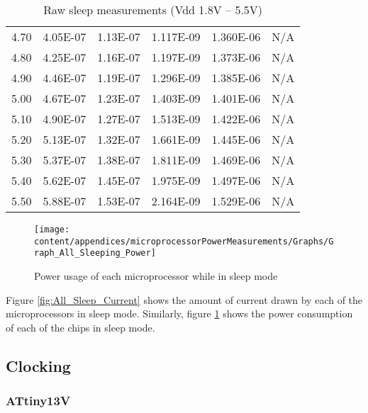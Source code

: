\begin{table}[htp]
\begin{centering}
\begin{tabular}{|r|r|r|r|r|r|}
4.70  & 4.05E-07  & 1.13E-07  & 1.117E-09  & 1.360E-06  & N/A \tabularnewline
4.80  & 4.25E-07  & 1.16E-07  & 1.197E-09  & 1.373E-06  & N/A \tabularnewline
4.90  & 4.46E-07  & 1.19E-07  & 1.296E-09  & 1.385E-06  & N/A \tabularnewline
5.00  & 4.67E-07  & 1.23E-07  & 1.403E-09  & 1.401E-06  & N/A \tabularnewline
5.10  & 4.90E-07  & 1.27E-07  & 1.513E-09  & 1.422E-06  & N/A \tabularnewline
5.20  & 5.13E-07  & 1.32E-07  & 1.661E-09  & 1.445E-06  & N/A \tabularnewline
5.30  & 5.37E-07  & 1.38E-07  & 1.811E-09  & 1.469E-06  & N/A \tabularnewline
5.40  & 5.62E-07  & 1.45E-07  & 1.975E-09  & 1.497E-06  & N/A \tabularnewline
5.50  & 5.88E-07  & 1.53E-07  & 2.164E-09  & 1.529E-06  & N/A \tabularnewline
\hline
\end{tabular}
\par\end{centering}

\protect\caption{Raw sleep measurements (Vdd 1.8V -- 5.5V)}
\end{table}
\begin{figure}
\begin{centering}
\texttt{[image: content/appendices/microprocessorPowerMeasurements/Graphs/Graph\_All\_Sleeping\_Power]}
\par\end{centering}

\protect\caption{\label{fig:All_SleepPower}Power usage of each microprocessor while
in sleep mode}


\end{figure}


Figure \ref{fig:All_Sleep_Current} shows the amount of current drawn
by each of the microprocessors in sleep mode. Similarly, figure \ref{fig:All_SleepPower}
shows the power consumption of each of the chips in sleep mode.


\subsection{Clocking}


\subsubsection{ATtiny13V}

